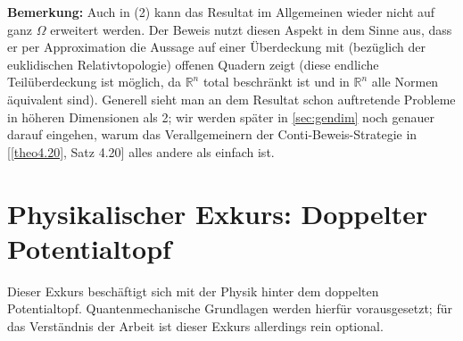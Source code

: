 \textbf{Bemerkung:} Auch in (2) kann das Resultat im Allgemeinen wieder nicht auf ganz \(\Omega\) erweitert werden. Der Beweis nutzt diesen Aspekt in dem Sinne aus, dass er per Approximation die Aussage auf einer Überdeckung mit (bezüglich der euklidischen Relativtopologie) offenen Quadern zeigt (diese endliche Teilüberdeckung ist möglich, da \(\mathbb{R}^n\) total beschränkt ist und in \(\mathbb{R}^n\) alle Normen äquivalent sind). Generell sieht man an dem Resultat schon auftretende Probleme in höheren Dimensionen als 2; wir werden später in \ref{sec:gendim} noch genauer darauf eingehen, warum das Verallgemeinern der Conti-Beweis-Strategie in [\ref{theo4.20}, Satz 4.20] alles andere als einfach ist.
\section{Physikalischer Exkurs: Doppelter Potentialtopf}{\label{sec:exwell}}
Dieser Exkurs beschäftigt sich mit der Physik hinter dem doppelten Potentialtopf. Quantenmechanische Grundlagen werden hierfür vorausgesetzt; für das Verständnis der Arbeit ist dieser Exkurs allerdings rein optional.\\

